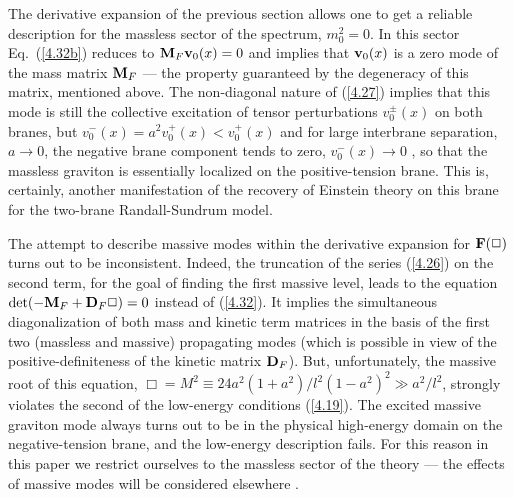 \documentclass[a4paper,preprint,nofootinbib,
                 showpacs,preprintnumbers,amsmath,amssymb]{revtex4}
\begin{document}
The derivative expansion of the previous section allows one to  
get a reliable description for the  
massless sector of the spectrum, $m_0^2=0$. In this sector 
Eq.~(\ref{4.32b}) reduces to ${\bf M}_F{\bf v}_0(x)=0$ and implies  
that ${\bf v}_0(x)$ is a zero mode of the mass matrix ${\bf M}_F$ ---  
the property guaranteed by the degeneracy of this matrix, mentioned  
above. The non-diagonal nature of (\ref{4.27}) implies that 
this mode is still the collective excitation of tensor perturbations 
$v^\pm_0(x)$ on both branes, but $v^-_0(x)=a^2 v^+_0(x)<v^+_0(x)$ and 
for large interbrane separation, $a\to 0$, the negative brane component 
tends to zero, $v^-_0(x)\to 0$ , so that the massless graviton is 
essentially localized on the positive-tension brane. This is, certainly, 
another manifestation of the recovery of Einstein theory on this brane 
for the two-brane Randall-Sundrum model. 
 
The attempt to describe massive modes within the derivative expansion 
for ${\bf F}(\Box)$ turns out to be inconsistent. Indeed, the truncation 
of the series (\ref{4.26}) on the second term, for the goal of finding 
the first massive level, leads to the equation 
${\rm det}(-{\bf M}_F+{\bf D}_F\Box)=0$ instead of (\ref{4.32}). It 
implies the simultaneous diagonalization of both mass and kinetic term 
matrices in the basis of the first two (massless and massive) propagating  
modes (which is possible in view of the positive-definiteness 
of the kinetic matrix ${\bf D}_F$). But, unfortunately, the massive  
root of this equation,  
$\Box=M^2\equiv 24a^2(1+a^2)/l^2(1-a^2)^2\gg a^2/l^2$, strongly violates  
the second of the low-energy conditions (\ref{4.19}). The excited 
massive graviton mode always turns out to be in the physical high-energy 
domain on the negative-tension brane, and the low-energy description 
fails. For this reason in this paper we restrict ourselves to the 
massless sector of the theory --- the effects of massive modes will be  
considered elsewhere \cite{rigo}.  
 
 
 
 
\end{document}
